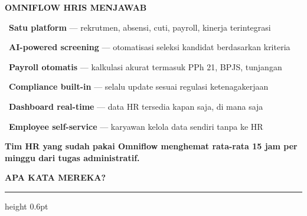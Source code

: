 \documentclass[a4paper]{article}
\newcommand{\sectiontitle}[1]{%
    \vspace{10pt}%
    {\fontsize{13}{16}\selectfont\bfseries\color{BlueDark} #1}\par\vspace{3pt}%
    {\color{BluePrimary}\hrule height 0.6pt}\par\vspace{8pt}%
}
\begin{document}
\begin{minipage}[t]{0.485\textwidth}
    \colorbox{BluePrimary}{%
        \begin{minipage}{\dimexpr\textwidth-14pt}
            \vspace{5pt}
            {\fontsize{10}{13}\selectfont\bfseries\color{White} OMNIFLOW HRIS MENJAWAB}
            \vspace{5pt}
        \end{minipage}}
    \vspace{6pt}

    {\fontsize{9.5}{13}\selectfont\color{TextDark}%
    \textbullet\ \textbf{Satu platform} — rekrutmen, absensi, cuti, payroll, kinerja terintegrasi\par\vspace{4pt}%
    \textbullet\ \textbf{AI-powered screening} — otomatisasi seleksi kandidat berdasarkan kriteria\par\vspace{4pt}%
    \textbullet\ \textbf{Payroll otomatis} — kalkulasi akurat termasuk PPh 21, BPJS, tunjangan\par\vspace{4pt}%
    \textbullet\ \textbf{Compliance built-in} — selalu update sesuai regulasi ketenagakerjaan\par\vspace{4pt}%
    \textbullet\ \textbf{Dashboard real-time} — data HR tersedia kapan saja, di mana saja\par\vspace{4pt}%
    \textbullet\ \textbf{Employee self-service} — karyawan kelola data sendiri tanpa ke HR}%
\end{minipage}

\vspace{8pt}

{\setlength{\fboxsep}{7pt}\setlength{\fboxrule}{0pt}%
\noindent\colorbox{BluePrimary}{%
    \begin{minipage}{\dimexpr\textwidth-2\fboxsep\relax}
        \centering
        {\fontsize{9.5}{12}\selectfont\bfseries\color{White}
        Tim HR yang sudah pakai Omniflow menghemat rata-rata \textbf{15 jam per minggu} dari tugas administratif.}
    \end{minipage}}}

\vspace{8pt}
\sectiontitle{APA KATA MEREKA?}
\end{document}
